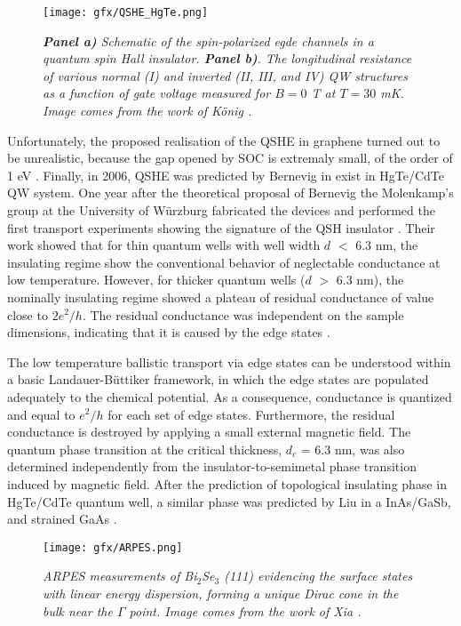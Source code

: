 \documentclass[titlepage,a4paper]{book}
\begin{document}
\begin{figure}[ht]
	\centering
	\texttt{[image: gfx/QSHE\_HgTe.png]}
	\vspace{-10pt}
	\caption{\textit{\textbf{Panel a)} Schematic of the spin-polarized egde channels in a quantum spin Hall insulator. \textbf{Panel b)}. The longitudinal resistance of various normal (I) and inverted (II, III, and IV) QW structures as a function of gate voltage measured for $B = 0$ T at $T = 30$ mK. Image comes from the work of König \cite{Konig_Topology}.}}
	\label{fig:QSHE_HgTe}
\end{figure} 

Unfortunately, the proposed realisation of the QSHE in graphene turned out to be unrealistic, because the gap opened by SOC is extremaly small, of the order of 1 \textmu eV \cite{Yao_Topology}\cite{Min_Topology}. Finally, in 2006, QSHE was predicted by Bernevig \cite{Bernevig_Topology2}\cite{Bernevig_Topology1} in exist in HgTe/CdTe QW system. One year after the theoretical proposal of Bernevig the Molenkamp's group at the University of Würzburg fabricated the devices and performed the first transport experiments showing the signature of the QSH insulator \cite{Konig_Topology}. Their work showed that for thin quantum wells with well width $d$ $<$ 6.3 nm, the insulating regime show the conventional behavior of neglectable conductance at low temperature. However, for thicker quantum wells ($d$ $>$ 6.3 nm), the nominally insulating regime showed a plateau of residual conductance of value close to $2e^2/h$. The residual conductance was independent on the sample dimensions, indicating that it is caused by the edge states \cite{Konig_Topology}. 

The low temperature ballistic transport via edge states can be understood within a basic Landauer-Büttiker \cite{Landauer_MCT} framework, in which the edge states are populated adequately to the chemical potential. As a consequence, conductance is quantized and equal to $e^2/h$ for each set of edge states. Furthermore, the residual conductance is destroyed by applying a small external magnetic field. The quantum phase transition at the critical thickness, $d_c$ = 6.3 nm, was also determined independently from the insulator-to-semimetal phase transition induced by magnetic field. After the prediction of topological insulating phase in HgTe/CdTe quantum well,  a similar phase was predicted by Liu \cite{Liu_Topology} in a InAs/GaSb, and strained GaAs \cite{Bernevig_Topology1}. 

\begin{figure}[ht]
	\centering
	\texttt{[image: gfx/ARPES.png]}
	\vspace{-10pt}
	\caption{\textit{ARPES measurements of Bi$_2$Se$_3$ (111) evidencing the surface states with linear energy dispersion, forming a unique Dirac cone in the bulk near the $\Gamma$ point. Image comes from the work of Xia \cite{Xia_Topology}.}}
	\label{fig:ARPES}
\end{figure}
\end{document}

